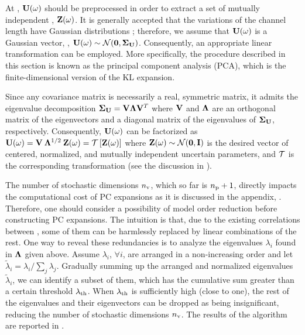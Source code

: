 At , $\mathbf{U}(\omega)$ should be preprocessed in order to extract a set of mutually independent \rvs, $\mathbf{Z}(\omega)$. It is generally accepted that the variations of the channel length have Gaussian distributions \cite{juan2011, juan2012, srivastava2010}; therefore, we assume that $\mathbf{U}(\omega)$ is a Gaussian vector, \ie, $\vU(\o) \sim \normal(\vZero, \mCov_\vU)$. Consequently, an appropriate linear transformation can be employed. More specifically, the procedure described in this section is known as the principal component analysis (PCA), which is the finite-dimensional version of the KL expansion.

Since any covariance matrix is necessarily a real, symmetric matrix, it admits the eigenvalue decomposition \cite{press2007} $\mCov_\vU = \m{V} \m{\Lambda} \m{V}^T$ where $\m{V}$ and $\m{\Lambda}$ are an orthogonal matrix of the eigenvectors and a diagonal matrix of the eigenvalues of $\mCov_\vU$, respectively. Consequently, $\mathbf{U}(\omega)$ can be factorized as $\vU(\o) = \m{V} \: \m{\Lambda}^{1/2} \: \vZ(\o) = \oTransform{\vZ(\o)}$ where $\vZ(\o) \sim \normal(\vZero, \mI)$ is the desired vector of centered, normalized, and mutually independent uncertain parameters, and $\oTransform$ is the corresponding transformation (see the discussion in ).

The number of stochastic dimensions ${n_\text{v}}$, which so far is ${n_\text{p}} + 1$, directly impacts the computational cost of PC expansions as it is discussed in the appendix, . Therefore, one should consider a possibility of model order reduction before constructing PC expansions. The intuition is that, due to the existing correlations between \rvs, some of them can be harmlessly replaced by linear combinations of the rest. One way to reveal these redundancies is to analyze the eigenvalues $\lambda_i$ found in $\m{\Lambda}$ given above. Assume $\lambda_i$, $\forall i$, are arranged in a non-increasing order and let $\tilde{\lambda}_i = \lambda_i / \sum_j \lambda_j$. Gradually summing up the arranged and normalized eigenvalues $\tilde{\lambda}_i$, we can identify a subset of them, which has the cumulative sum greater than a certain threshold $\lambda_\text{th}$. When $\lambda_\text{th}$ is sufficiently high (close to one), the rest of the eigenvalues and their eigenvectors can be dropped as being insignificant, reducing the number of stochastic dimensions ${n_\text{v}}$. The results of the algorithm are reported in .
